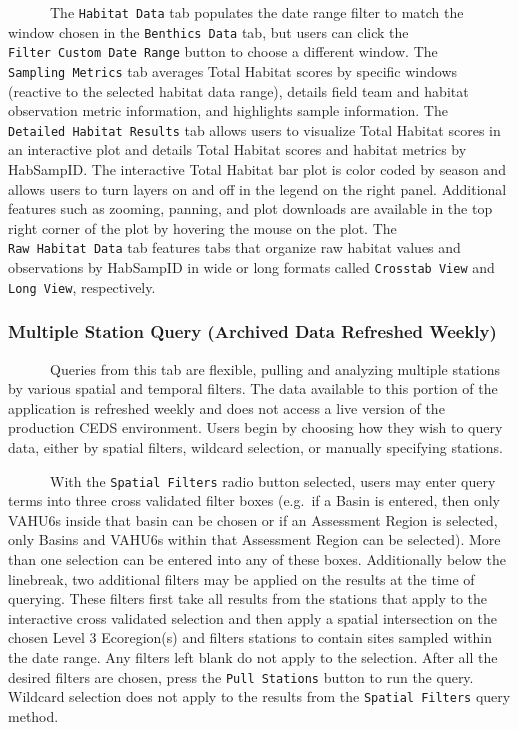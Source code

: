 \documentclass[
]{article}
\begin{document}
~~~~~~The \texttt{Habitat\ Data} tab populates the date range filter to
match the window chosen in the \texttt{Benthics\ Data} tab, but users
can click the \texttt{Filter\ Custom\ Date\ Range} button to choose a
different window. The \texttt{Sampling\ Metrics} tab averages Total
Habitat scores by specific windows (reactive to the selected habitat
data range), details field team and habitat observation metric
information, and highlights sample information. The
\texttt{Detailed\ Habitat\ Results} tab allows users to visualize Total
Habitat scores in an interactive plot and details Total Habitat scores
and habitat metrics by HabSampID. The interactive Total Habitat bar plot
is color coded by season and allows users to turn layers on and off in
the legend on the right panel. Additional features such as zooming,
panning, and plot downloads are available in the top right corner of the
plot by hovering the mouse on the plot. The \texttt{Raw\ Habitat\ Data}
tab features tabs that organize raw habitat values and observations by
HabSampID in wide or long formats called \texttt{Crosstab\ View} and
\texttt{Long\ View}, respectively.

\hypertarget{multiple-station-query-archived-data-refreshed-weekly}{%
\subsubsection{Multiple Station Query (Archived Data Refreshed
Weekly)}\label{multiple-station-query-archived-data-refreshed-weekly}}

~~~~~~Queries from this tab are flexible, pulling and analyzing multiple
stations by various spatial and temporal filters. The data available to
this portion of the application is refreshed weekly and does not access
a live version of the production CEDS environment. Users begin by
choosing how they wish to query data, either by spatial filters,
wildcard selection, or manually specifying stations.

~~~~~~With the \texttt{Spatial\ Filters} radio button selected, users
may enter query terms into three cross validated filter boxes (e.g.~if a
Basin is entered, then only VAHU6s inside that basin can be chosen or if
an Assessment Region is selected, only Basins and VAHU6s within that
Assessment Region can be selected). More than one selection can be
entered into any of these boxes. Additionally below the linebreak, two
additional filters may be applied on the results at the time of
querying. These filters first take all results from the stations that
apply to the interactive cross validated selection and then apply a
spatial intersection on the chosen Level 3 Ecoregion(s) and filters
stations to contain sites sampled within the date range. Any filters
left blank do not apply to the selection. After all the desired filters
are chosen, press the \texttt{Pull\ Stations} button to run the query.
Wildcard selection does not apply to the results from the
\texttt{Spatial\ Filters} query method.
\end{document}
